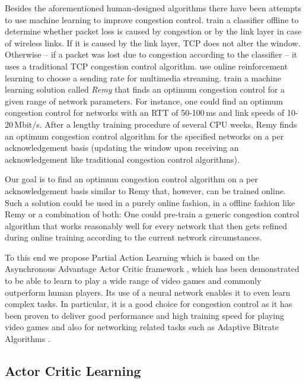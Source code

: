 \documentclass[newfonts=false,format=sigconf,10pt,letterpaper]{acmart}
\begin{document}
Besides the aforementioned human-designed algorithms there have been attempts to use machine learning to improve congestion control. \citet{geurts_machine_2004} train a classifier offline to determine whether packet loss is caused by congestion or by the link layer in case of wireless links. If it is caused by the link layer, TCP does not alter the window. Otherwise -- if a packet was lost due to congestion according to the classifier -- it uses a traditional TCP congestion control algorithm. \citet{shaio_reinforcement_2005} use online reinforcement learning to choose a sending rate for multimedia streaming. \citet{winstein_tcp_2013} train a machine learning solution called \textit{Remy} that finds an optimum congestion control for a given range of network parameters. For instance, one could find an optimum congestion control for networks with an RTT of 50-100\,ms and link speeds of 10-20\,Mbit/s. After a lengthy training procedure of several CPU weeks, Remy finds an optimum congestion control algorithm for the specified networks on a per acknowledgement basis (updating the window upon receiving an acknowledgement like traditional congestion control algorithms). 

Our goal is to find an optimum congestion control algorithm on a per acknowledgement basis similar to Remy that, however, can be trained online.  Such a solution could be used in a purely online fashion, in a offline fashion like Remy or a combination of both: One could pre-train a generic congestion control algorithm that works reasonably well for every network that then gets refined during online training according to the current network circumstances. 

To this end we propose Partial Action Learning which is based on the Asynchronous Advantage Actor Critic framework \cite{mnih_asynchronous_2016}, which has been demonstrated to be able to learn to play a wide range of video games and commonly outperform human players. Its use of a neural network enables it to even learn complex tasks. In particular, it is a good choice for congestion control as it has been proven to deliver good performance and high training speed for playing video games and also for networking related tasks such as Adaptive Bitrate Algorithms \cite{mao_neural_2017}. 

\subsection{Actor Critic Learning}
\label{subsec:ac}
\end{document}
